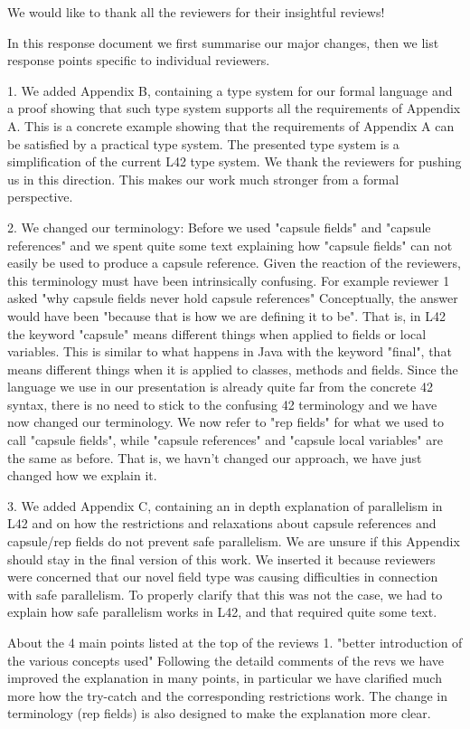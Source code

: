 We would like to thank all the reviewers for their insightful reviews!

In this response document we first summarise our major changes, then we list response points specific to individual reviewers.

1.  We added Appendix B, containing a type system for our formal language and a proof showing that such type system
supports all the requirements of Appendix A. This is a concrete example showing that the requirements of Appendix A
can be satisfied by a practical type system. The presented type system is a simplification of the current L42 type system.
We thank the reviewers for pushing us in this direction. This makes our work much stronger from a formal perspective.

2. We changed our terminology:
Before we used "capsule fields" and "capsule references" and we spent quite some text explaining how 
"capsule fields" can not easily be used to produce a capsule reference. Given the reaction of the reviewers, this terminology must have been intrinsically confusing.
For example reviewer 1 asked "why capsule fields never hold capsule references"
Conceptually, the answer would have been "because that is how we are defining it to be".
That is, in L42 the keyword "capsule" means different things when applied to fields or local variables.
This is similar to what happens in Java with the keyword "final", that means different things when it is applied to classes, methods and fields.
Since the language we use in our presentation is already quite far from the concrete 42 syntax, there is no need to stick to the confusing 42 terminology and we have now changed our terminology.
We now refer to "rep fields" for what we used to call "capsule fields",
while "capsule references" and "capsule local variables" are the same as before.
That is, we havn't changed our approach, we have just changed how we explain it.

3. We added Appendix C, containing an in depth explanation of parallelism in L42 and on how the restrictions and relaxations
 about capsule references and capsule/rep fields do not prevent safe parallelism.
We are unsure if this Appendix should stay in the final version of this work. 
We inserted it because reviewers were concerned that our novel field type was causing difficulties in connection with safe parallelism.
To properly clarify that this was not the case, we had to explain how safe parallelism works in L42, and that required quite some text.

About the 4 main points listed at the top of the reviews
1. "better introduction of the various concepts used"
Following the detaild comments of the revs we have improved the explanation in many points, in particular we have clarified much more how the try-catch and the corresponding restrictions work. The change in terminology (rep fields) is also designed to make the explanation more clear.

